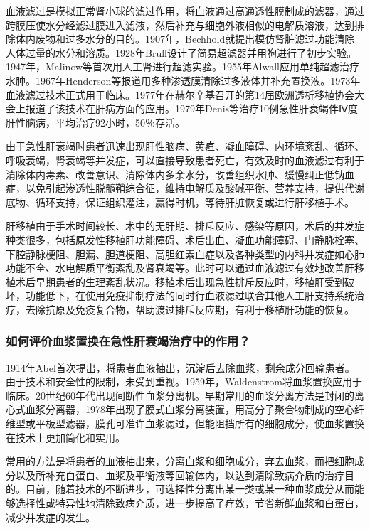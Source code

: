 血液滤过是模拟正常肾小球的滤过作用，将血液通过高通透性膜制成的滤器，通过跨膜压使水分经滤过膜进入滤液，然后补充与细胞外液相似的电解质溶液，达到排除体内废物和过多水分的目的。1907年，Bechhold就提出模仿肾脏滤过功能清除人体过量的水分和溶质。1928年Brull设计了简易超滤器并用狗进行了初步实验。1947年，Malinow等首次用人工肾进行超滤实验。1955年Alwall应用单纯超滤治疗水肿。1967年Henderson等报道用多种渗透膜清除过多液体并补充置换液。1973年血液滤过技术正式用于临床。1977年在赫尔辛基召开的第14届欧洲透析移植协会大会上报道了该技术在肝病方面的应用。1979年Denis等治疗10例急性肝衰竭伴Ⅳ度肝性脑病，平均治疗92小时，50％存活。

由于急性肝衰竭时患者迅速出现肝性脑病、黄疸、凝血障碍、内环境紊乱、循环、呼吸衰竭，肾衰竭等并发症，可以直接导致患者死亡，有效及时的血液滤过有利于清除体内毒素、改善意识、清除体内多余水分，改善组织水肿、缓慢纠正低钠血症，以免引起渗透性脱髓鞘综合征，维持电解质及酸碱平衡、营养支持，提供代谢底物、循环支持，保证组织灌注，赢得时机，等待肝脏恢复或进行肝移植手术。

肝移植由于手术时间较长、术中的无肝期、排斥反应、感染等原因，术后的并发症种类很多，包括原发性移植肝功能障碍、术后出血、凝血功能障碍、门静脉栓塞、下腔静脉梗阻、胆漏、胆道梗阻、高胆红素血症以及各种类型的内科并发症如心肺功能不全、水电解质平衡紊乱及肾衰竭等。此时可以通过血液滤过有效地改善肝移植术后早期患者的生理紊乱状况。移植术后出现急性排斥反应时，移植肝受到破坏，功能低下，在使用免疫抑制疗法的同时行血液滤过联合其他人工肝支持系统治疗，去除抗原及免疫复合物，帮助渡过排斥反应期，有利于移植肝功能的恢复。

\subsubsection{如何评价血浆置换在急性肝衰竭治疗中的作用？}

1914年Abel首次提出，将患者血液抽出，沉淀后去除血浆，剩余成分回输患者。由于技术和安全性的限制，未受到重视。1959年，Waldenstrom将血浆置换应用于临床。20世纪60年代出现间断性血浆分离机。早期常用的血浆分离方法是封闭的离心式血浆分离器，1978年出现了膜式血浆分离装置，用高分子聚合物制成的空心纤维型或平板型滤器，膜孔可准许血浆滤过，但能阻挡所有的细胞成分，使血浆置换在技术上更加简化和实用。

常用的方法是将患者的血液抽出来，分离血浆和细胞成分，弃去血浆，而把细胞成分以及所补充白蛋白、血浆及平衡液等回输体内，以达到清除致病介质的治疗目的。目前，随着技术的不断进步，可选择性分离出某一类或某一种血浆成分从而能够选择性或特异性地清除致病介质，进一步提高了疗效，节省新鲜血浆和白蛋白，减少并发症的发生。

